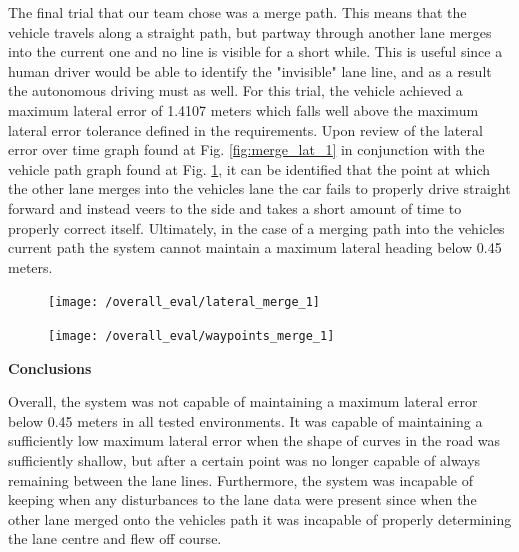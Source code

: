 \documentclass[titlepage,draft]{article}
\begin{document}
{The final trial that our team chose was a merge path. This means that the vehicle travels along a straight path, but partway through another lane merges into the current one and no line is visible for a short while. This is useful since a human driver would be able to identify the "invisible" lane line, and as a result the autonomous driving must as well. For this trial, the vehicle achieved a maximum lateral error of 1.4107 meters which falls well above the maximum lateral error tolerance defined in the requirements. Upon review of the lateral error over time graph found at Fig. \ref{fig:merge_lat_1} in conjunction with the vehicle path graph found at Fig. \ref{fig:merge_way_1}, it can be identified that the point at which the other lane merges into the vehicles lane the car fails to properly drive straight forward and instead veers to the side and takes a short amount of time to properly correct itself. Ultimately, in the case of a merging path into the vehicles current path the system cannot maintain a maximum lateral heading below 0.45 meters.

\begin{figure}
	\centering
	\begin{minipage}{.45\textwidth}
		\centering
		\texttt{[image: /overall\_eval/lateral\_merge\_1]}
		\label{fig:merge_lat_1}
	\end{minipage}%
	\hspace{0.1\textwidth}%
	\begin{minipage}{.45\textwidth}
		\centering
		\texttt{[image: /overall\_eval/waypoints\_merge\_1]}
		\label{fig:merge_way_1}
	\end{minipage}
\end{figure}

\textbf{Conclusions}

Overall, the system was not capable of maintaining a maximum lateral error below 0.45 meters in all tested environments. It was capable of maintaining a sufficiently low maximum lateral error when the shape of curves in the road was sufficiently shallow, but after a certain point was no longer capable of always remaining between the lane lines. Furthermore, the system was incapable of keeping when any disturbances to the lane data were present since when the other lane merged onto the vehicles path it was incapable of properly determining the lane centre and flew off course.

}
\end{document}
